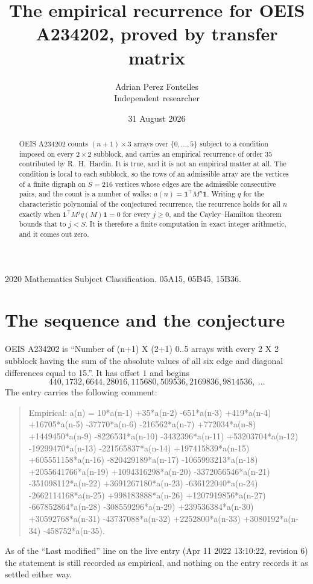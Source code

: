 \documentclass[11pt,a4paper]{article}
\title{The empirical recurrence for OEIS A234202, proved by transfer matrix}
\author{Adrian Perez Fontelles\\ \small Independent researcher}
\date{31 August 2026}
\theoremstyle{plain}
\theoremstyle{definition}
\begin{document}
\maketitle

\begin{abstract}
OEIS A234202 counts $(n+1)\times3$ arrays over $\{0,\dots,5\}$ subject to a condition imposed on
every $2\times2$ subblock, and carries an empirical recurrence of order $35$ contributed
by R.~H.~Hardin. It is true, and it is not an empirical matter at all. The condition is local
to each subblock, so the rows of an admissible array are the vertices of a finite digraph
on $S=216$ vertices whose edges are the admissible consecutive pairs, and the count is a
number of walks: $a(n)=\mathbf{1}^{\!\top}M^{n}\mathbf{1}$. Writing $q$
for the characteristic polynomial of the conjectured recurrence, the recurrence holds for all
$n$ exactly when $\mathbf{1}^{\!\top}M^{j}q(M)\mathbf{1}=0$ for every $j\ge0$, and the
Cayley--Hamilton theorem bounds that to $j<S$. It is therefore a finite computation in exact
integer arithmetic, and it comes out zero.
\end{abstract}

\noindent\small 2020 Mathematics Subject Classification. 05A15, 05B45, 15B36.\normalsize

\section{The sequence and the conjecture}

OEIS A234202 is ``Number of (n+1) X (2+1) 0..5 arrays with every 2 X 2 subblock having the sum of the absolute values of all six edge and diagonal differences equal to 15.''. It has offset $1$ and begins
\[
440, 1732, 6644, 28016, 115680, 509536, 2169836, 9814536,\ \dots
\]
The entry carries the following comment:
\begin{quote}\small
Empirical: a(n) = 10*a(n-1) +35*a(n-2) -651*a(n-3) +419*a(n-4) +16705*a(n-5) -37770*a(n-6) -216562*a(n-7) +772034*a(n-8) +1449450*a(n-9) -8226531*a(n-10) -3432396*a(n-11) +53203704*a(n-12) -19299470*a(n-13) -221565837*a(n-14) +197415839*a(n-15) +605551158*a(n-16) -820429189*a(n-17) -1065993213*a(n-18) +2055641766*a(n-19) +1094316298*a(n-20) -3372056546*a(n-21) -351098112*a(n-22) +3691267180*a(n-23) -636122040*a(n-24) -2662114168*a(n-25) +998183888*a(n-26) +1207919856*a(n-27) -667852864*a(n-28) -308559296*a(n-29) +239536384*a(n-30) +30592768*a(n-31) -43737088*a(n-32) +2252800*a(n-33) +3080192*a(n-34) -458752*a(n-35).
\end{quote}
As of the ``Last modified'' line on the live entry (Apr 11 2022 13:10:22, revision 6) the statement is
still recorded as empirical, and nothing on the entry records it as settled either way.
\end{document}
